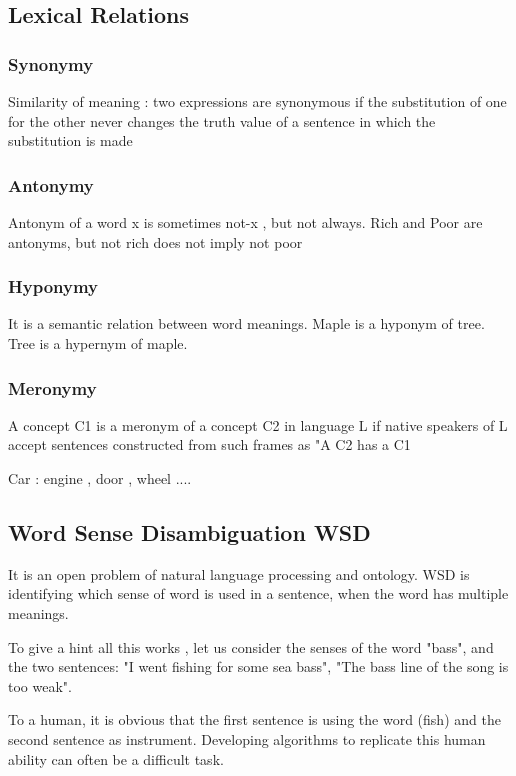 \documentclass{article}
\begin{document}
\subsection{Lexical Relations}
\subsubsection{Synonymy}

Similarity of meaning : two expressions are synonymous if the substitution of one for the other never changes the truth value of a sentence in which the substitution is made

\subsubsection{Antonymy}

Antonym of a word x is sometimes not-x , but not always.
Rich and Poor are antonyms, but not rich does not imply not poor

\subsubsection{Hyponymy}

It is a semantic relation between word meanings.
Maple is a hyponym of tree. Tree is a hypernym of maple.

\subsubsection{Meronymy}

A concept C1 is a meronym of a concept C2 in language L if native speakers of L accept sentences constructed from such frames as "A C2 has a C1

Car : engine , door , wheel ....

\subsection{Word Sense Disambiguation WSD}

It is an open problem of natural language processing and ontology. WSD is identifying which sense of word is used in a sentence, when the word has multiple meanings.

To give a hint all this works , let us consider the senses of the word "bass", and the two sentences: "I went fishing for some sea bass", "The bass line of the song is too weak".

To a human, it is obvious that the first sentence is using the word (fish) and the second sentence as instrument. Developing algorithms to replicate this human ability can often be a difficult task.
\end{document}
